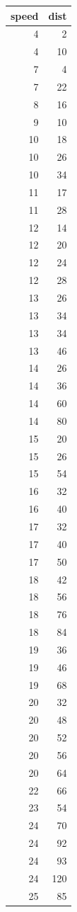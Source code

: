 \documentclass[
]{book}
\theoremstyle{definition}
\theoremstyle{definition}
\theoremstyle{definition}
\theoremstyle{definition}
\theoremstyle{remark}
\begin{document}
\begin{tabular}{r|r}
\hline
speed & dist\\
\hline
4 & 2\\
\hline
4 & 10\\
\hline
7 & 4\\
\hline
7 & 22\\
\hline
8 & 16\\
\hline
9 & 10\\
\hline
10 & 18\\
\hline
10 & 26\\
\hline
10 & 34\\
\hline
11 & 17\\
\hline
11 & 28\\
\hline
12 & 14\\
\hline
12 & 20\\
\hline
12 & 24\\
\hline
12 & 28\\
\hline
13 & 26\\
\hline
13 & 34\\
\hline
13 & 34\\
\hline
13 & 46\\
\hline
14 & 26\\
\hline
14 & 36\\
\hline
14 & 60\\
\hline
14 & 80\\
\hline
15 & 20\\
\hline
15 & 26\\
\hline
15 & 54\\
\hline
16 & 32\\
\hline
16 & 40\\
\hline
17 & 32\\
\hline
17 & 40\\
\hline
17 & 50\\
\hline
18 & 42\\
\hline
18 & 56\\
\hline
18 & 76\\
\hline
18 & 84\\
\hline
19 & 36\\
\hline
19 & 46\\
\hline
19 & 68\\
\hline
20 & 32\\
\hline
20 & 48\\
\hline
20 & 52\\
\hline
20 & 56\\
\hline
20 & 64\\
\hline
22 & 66\\
\hline
23 & 54\\
\hline
24 & 70\\
\hline
24 & 92\\
\hline
24 & 93\\
\hline
24 & 120\\
\hline
25 & 85\\
\hline
\end{tabular}
\end{document}
